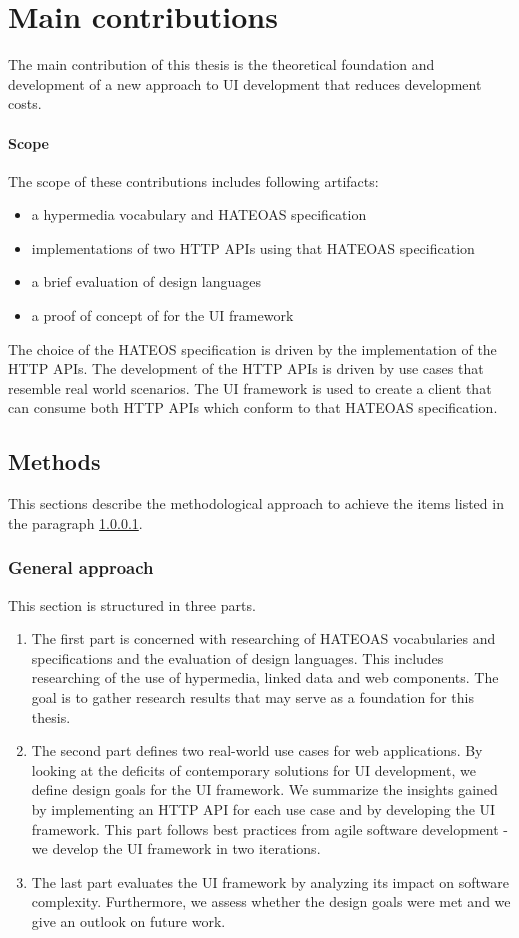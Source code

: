 \section{Main contributions}\label{contributions}
The main contribution of this thesis is the theoretical foundation and development of a new approach to UI development that reduces development costs.

\paragraph{Scope}\label{sec:scope}
The scope of these contributions includes following artifacts:

\begin{itemize}
\item a hypermedia vocabulary and HATEOAS specification
\item implementations of two HTTP APIs using that HATEOAS specification
\item a brief evaluation of design languages
\item a proof of concept of for the UI framework
\end{itemize}
The choice of the HATEOS specification is driven by the implementation of the HTTP APIs. The development of the HTTP APIs is driven by use cases that resemble real world scenarios. The UI framework is used to create a client that can consume both HTTP APIs which conform to that HATEOAS specification.

\subsection{Methods}
This sections describe the methodological approach to achieve the items listed in the paragraph \ref{sec:scope}.

\subsubsection{General approach}
This section is structured in three parts.

\begin{enumerate}
\item The first part is concerned with researching of HATEOAS vocabularies and specifications and the evaluation of design languages. This includes researching of the use of hypermedia, linked data and web components. The goal is to gather research results that may serve as a foundation for this thesis.
\item The second part defines two real-world use cases for web applications. By looking at the deficits of contemporary solutions for UI development, we define design goals for the UI framework. We summarize the insights gained by implementing an HTTP API for each use case and by developing the UI framework. This part follows best practices from agile software development - we develop the UI framework in two iterations.
\item The last part evaluates the UI framework by analyzing its impact on software complexity. Furthermore, we assess whether the design goals were met and we give an outlook on future work.
\end{enumerate}

